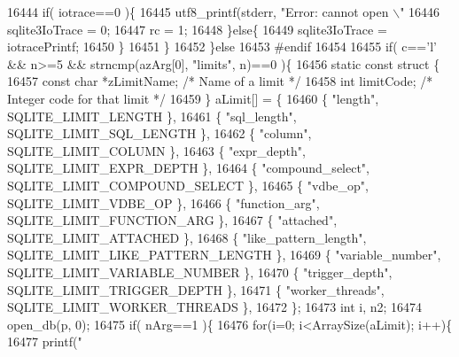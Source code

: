 \begin{DoxyCode}
{{{{{{{{{{{{{{{{{{{{{{{{{{{{{{{{{{{{{{{{{{{{{{{{{16444       \textcolor{keywordflow}{if}( iotrace==0 )\{
16445         utf8_printf(stderr, \textcolor{stringliteral}{"Error: cannot open \(\backslash\)"%
16446         sqlite3IoTrace = 0;
16447         rc = 1;
16448       \}\textcolor{keywordflow}{else}\{
16449         sqlite3IoTrace = iotracePrintf;
16450       \}
16451     \}
16452   \}\textcolor{keywordflow}{else}
16453 \textcolor{preprocessor}{#endif}
16454 
16455   \textcolor{keywordflow}{if}( c==\textcolor{charliteral}{'l'} && n>=5 && strncmp(azArg[0], \textcolor{stringliteral}{"limits"}, n)==0 )\{
16456     \textcolor{keyword}{static} \textcolor{keyword}{const} \textcolor{keyword}{struct }\{
16457        \textcolor{keyword}{const} \textcolor{keywordtype}{char} *zLimitName;   \textcolor{comment}{/* Name of a limit */}
16458        \textcolor{keywordtype}{int} limitCode;            \textcolor{comment}{/* Integer code for that limit */}
16459     \} aLimit[] = \{
16460       \{ \textcolor{stringliteral}{"length"},                SQLITE_LIMIT_LENGTH                    \},
16461       \{ \textcolor{stringliteral}{"sql\_length"},            SQLITE_LIMIT_SQL_LENGTH                \},
16462       \{ \textcolor{stringliteral}{"column"},                SQLITE_LIMIT_COLUMN                    \},
16463       \{ \textcolor{stringliteral}{"expr\_depth"},            SQLITE_LIMIT_EXPR_DEPTH                \},
16464       \{ \textcolor{stringliteral}{"compound\_select"},       SQLITE_LIMIT_COMPOUND_SELECT           \},
16465       \{ \textcolor{stringliteral}{"vdbe\_op"},               SQLITE_LIMIT_VDBE_OP                   \},
16466       \{ \textcolor{stringliteral}{"function\_arg"},          SQLITE_LIMIT_FUNCTION_ARG              \},
16467       \{ \textcolor{stringliteral}{"attached"},              SQLITE_LIMIT_ATTACHED                  \},
16468       \{ \textcolor{stringliteral}{"like\_pattern\_length"},   SQLITE_LIMIT_LIKE_PATTERN_LENGTH       \},
16469       \{ \textcolor{stringliteral}{"variable\_number"},       SQLITE_LIMIT_VARIABLE_NUMBER           \},
16470       \{ \textcolor{stringliteral}{"trigger\_depth"},         SQLITE_LIMIT_TRIGGER_DEPTH             \},
16471       \{ \textcolor{stringliteral}{"worker\_threads"},        SQLITE_LIMIT_WORKER_THREADS            \},
16472     \};
16473     \textcolor{keywordtype}{int} i, n2;
16474     open_db(p, 0);
16475     \textcolor{keywordflow}{if}( nArg==1 )\{
16476       \textcolor{keywordflow}{for}(i=0; i<ArraySize(aLimit); i++)\{
16477         printf(\textcolor{stringliteral}{"%
}}}}}}}}}}}}}}}}}}}}}}}}}}}}}}}}}}}}}}}}}}}}}}}}}}}
\end{DoxyCode}
